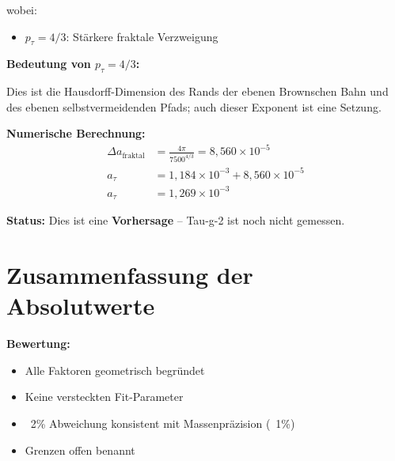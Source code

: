 	wobei:
	\begin{itemize}
		\item $p_\tau = 4/3$: Stärkere fraktale Verzweigung
	\end{itemize}
	
	\textbf{Bedeutung von $p_\tau = 4/3$:}
	
	Dies ist die Hausdorff-Dimension des Rands der ebenen Brownschen Bahn und des ebenen selbstvermeidenden Pfads; auch dieser Exponent ist eine Setzung.
	
	\textbf{Numerische Berechnung:}
	\begin{align}
		\Delta a_{\text{fraktal}} &= \frac{4\pi}{7500^{4/3}} = 8{,}560 \times 10^{-5} \\
		a_\tau &= 1{,}184 \times 10^{-3} + 8{,}560 \times 10^{-5} \\
		a_\tau &= 1{,}269 \times 10^{-3}
	\end{align}
	
	\textbf{Status:} Dies ist eine \textbf{Vorhersage} -- Tau-g-2 ist noch nicht gemessen.
	
	\section{Zusammenfassung der Absolutwerte}
	
	\begin{table}[h]
		\centering
		\caption{g-2 Absolutwerte: T0 vs. Experiment}
	\end{table}
	
	\textbf{Bewertung:}
	\begin{itemize}
		\item Alle Faktoren geometrisch begründet
		\item Keine versteckten Fit-Parameter
		\item ~2\% Abweichung konsistent mit Massenpräzision (~1\%)
		\item Grenzen offen benannt
	\end{itemize}
